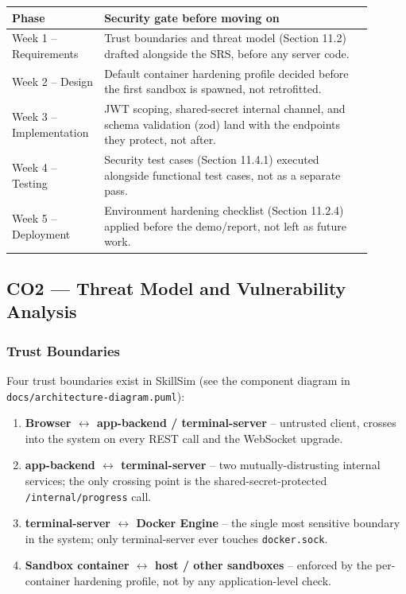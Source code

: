 \documentclass[11pt]{article}
\begin{document}
\begin{center}
\begin{tabular}{@{}p{0.20\linewidth}p{0.70\linewidth}@{}}
\toprule
\textbf{Phase} & \textbf{Security gate before moving on} \\
\midrule
Week 1 -- Requirements & Trust boundaries and threat model
(Section 11.2) drafted alongside the SRS, before any server code. \\
Week 2 -- Design & Default container hardening profile decided
before the first sandbox is spawned, not retrofitted. \\
Week 3 -- Implementation & JWT scoping, shared-secret internal
channel, and schema validation (zod) land with the endpoints they
protect, not after. \\
Week 4 -- Testing & Security test cases (Section 11.4.1) executed
alongside functional test cases, not as a separate pass. \\
Week 5 -- Deployment & Environment hardening checklist
(Section 11.2.4) applied before the demo/report, not left as future
work. \\
\bottomrule
\end{tabular}
\end{center}

\subsection{CO2 --- Threat Model and Vulnerability Analysis}

\subsubsection{Trust Boundaries}
Four trust boundaries exist in SkillSim (see the component diagram in
\texttt{docs/architecture-diagram.puml}):
\begin{enumerate}
\item \textbf{Browser $\leftrightarrow$ app-backend / terminal-server} --
      untrusted client, crosses into the system on every REST call and
      the WebSocket upgrade.
\item \textbf{app-backend $\leftrightarrow$ terminal-server} -- two
      mutually-distrusting internal services; the only crossing point
      is the shared-secret-protected \texttt{/internal/progress} call.
\item \textbf{terminal-server $\leftrightarrow$ Docker Engine} -- the
      single most sensitive boundary in the system; only
      terminal-server ever touches \texttt{docker.sock}.
\item \textbf{Sandbox container $\leftrightarrow$ host / other
      sandboxes} -- enforced by the per-container hardening profile,
      not by any application-level check.
\end{enumerate}
\end{document}
